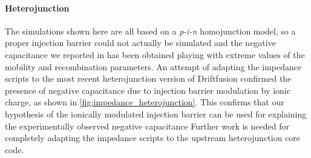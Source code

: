 \begin{figure}
\end{figure}

\paragraph{Heterojunction}
The simulations shown here are all based on a \textit{p-i-n} homojunction model, so a proper injection barrier could not actually be simulated and the negative capacitance we reported in  has been obtained playing with extreme values of the mobility and recombination parameters.
An attempt of adapting the impedance scripts to the most recent heterojunction version of Driftfusion confirmed the presence of negative capacitance due to injection barrier modulation by ionic charge, as shown in \cref{fig:impedance_heterojunction}.
This confirms that our hypothesis of the ionically modulated injection barrier can be used for explaining the experimentally observed negative capacitance \cite{Guerrero2016,Moia2019,Ghahremanirad2017,Sanchez2014}
Further work is needed for completely adapting the impedance scripts to the upstream heterojunction core code.

